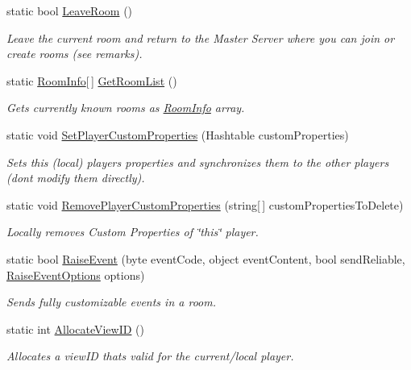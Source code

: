 \begin{DoxyCompactItemize}
static bool \hyperlink{class_photon_network_abb27939f0325b53c94f5ad52199b63b7}{Leave\+Room} ()
\begin{DoxyCompactList}\small\item\em Leave the current room and return to the Master Server where you can join or create rooms (see remarks). \end{DoxyCompactList}\item 
static \hyperlink{class_room_info}{Room\+Info}\mbox{[}$\,$\mbox{]} \hyperlink{class_photon_network_aeef2085375accb7d4bc88e60cbe15eb9}{Get\+Room\+List} ()
\begin{DoxyCompactList}\small\item\em Gets currently known rooms as \hyperlink{class_room_info}{Room\+Info} array. \end{DoxyCompactList}\item 
static void \hyperlink{class_photon_network_a3badca00ee2bacec4eaccac76002f0ac}{Set\+Player\+Custom\+Properties} (Hashtable custom\+Properties)
\begin{DoxyCompactList}\small\item\em Sets this (local) player\textquotesingle{}s properties and synchronizes them to the other players (don\textquotesingle{}t modify them directly). \end{DoxyCompactList}\item 
static void \hyperlink{class_photon_network_a4c59e3c4feeaf44293eef1d8d19b98a2}{Remove\+Player\+Custom\+Properties} (string\mbox{[}$\,$\mbox{]} custom\+Properties\+To\+Delete)
\begin{DoxyCompactList}\small\item\em Locally removes Custom Properties of \char`\"{}this\char`\"{} player. \end{DoxyCompactList}\item 
static bool \hyperlink{class_photon_network_aa9088b089a8c1b3548f8a7a792146e50}{Raise\+Event} (byte event\+Code, object event\+Content, bool send\+Reliable, \hyperlink{class_raise_event_options}{Raise\+Event\+Options} options)
\begin{DoxyCompactList}\small\item\em Sends fully customizable events in a room. \end{DoxyCompactList}\item 
static int \hyperlink{class_photon_network_a2eefb7151b27169d11062be9996a0eab}{Allocate\+View\+ID} ()
\begin{DoxyCompactList}\small\item\em Allocates a view\+ID that\textquotesingle{}s valid for the current/local player. \end{DoxyCompactList}\item 

\end{DoxyCompactItemize}

